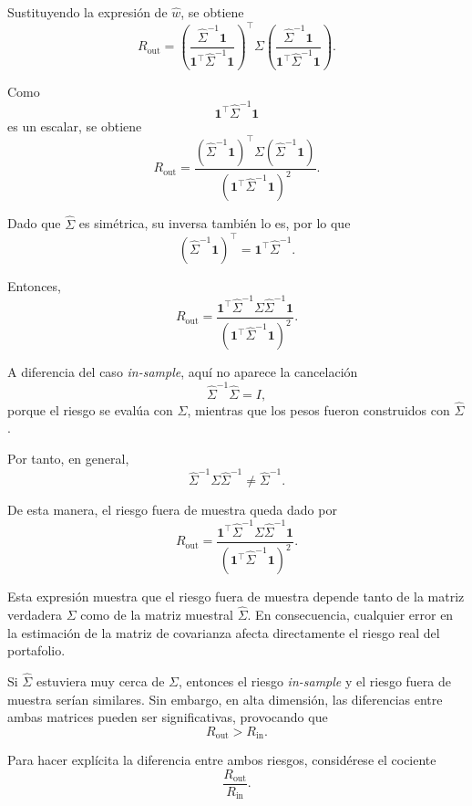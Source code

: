 \documentclass[letterpaper,12pt,oneside]{book}
\begin{document}
Sustituyendo la expresión de \(\widehat{w}\), se obtiene
\[
R_{\mathrm{out}}
=
\left(
\frac{
\widehat{\Sigma}^{-1}\mathbf{1}
}{
\mathbf{1}^\top
\widehat{\Sigma}^{-1}
\mathbf{1}
}
\right)^\top
\Sigma
\left(
\frac{
\widehat{\Sigma}^{-1}\mathbf{1}
}{
\mathbf{1}^\top
\widehat{\Sigma}^{-1}
\mathbf{1}
}
\right).
\]

Como
\[
\mathbf{1}^\top
\widehat{\Sigma}^{-1}
\mathbf{1}
\]
es un escalar, se obtiene
\[
R_{\mathrm{out}}
=
\frac{
(\widehat{\Sigma}^{-1}\mathbf{1})^\top
\Sigma
(\widehat{\Sigma}^{-1}\mathbf{1})
}{
\left(
\mathbf{1}^\top
\widehat{\Sigma}^{-1}
\mathbf{1}
\right)^2
}.
\]

Dado que \(\widehat{\Sigma}\) es simétrica, su inversa también lo es, por lo que
\[
(\widehat{\Sigma}^{-1}\mathbf{1})^\top
=
\mathbf{1}^\top
\widehat{\Sigma}^{-1}.
\]

Entonces,
\[
R_{\mathrm{out}}
=
\frac{
\mathbf{1}^\top
\widehat{\Sigma}^{-1}
\Sigma
\widehat{\Sigma}^{-1}
\mathbf{1}
}{
\left(
\mathbf{1}^\top
\widehat{\Sigma}^{-1}
\mathbf{1}
\right)^2
}.
\]

A diferencia del caso \textit{in-sample}, aquí no aparece la cancelación
\[
\widehat{\Sigma}^{-1}\widehat{\Sigma}=I,
\]
porque el riesgo se evalúa con \(\Sigma\), mientras que los pesos fueron construidos con \(\widehat{\Sigma}\).

Por tanto, en general,
\[
\widehat{\Sigma}^{-1}\Sigma\widehat{\Sigma}^{-1}
\neq
\widehat{\Sigma}^{-1}.
\]

De esta manera, el riesgo fuera de muestra queda dado por
\[
R_{\mathrm{out}}
=
\frac{
\mathbf{1}^\top
\widehat{\Sigma}^{-1}
\Sigma
\widehat{\Sigma}^{-1}
\mathbf{1}
}{
\left(
\mathbf{1}^\top
\widehat{\Sigma}^{-1}
\mathbf{1}
\right)^2
}.
\]

Esta expresión muestra que el riesgo fuera de muestra depende tanto de la matriz verdadera \(\Sigma\) como de la matriz muestral \(\widehat{\Sigma}\). En consecuencia, cualquier error en la estimación de la matriz de covarianza afecta directamente el riesgo real del portafolio.

Si \(\widehat{\Sigma}\) estuviera muy cerca de \(\Sigma\), entonces el riesgo \textit{in-sample} y el riesgo fuera de muestra serían similares. Sin embargo, en alta dimensión, las diferencias entre ambas matrices pueden ser significativas, provocando que
\[
R_{\mathrm{out}}
>
R_{\mathrm{in}}.
\]

Para hacer explícita la diferencia entre ambos riesgos, considérese el cociente
\[
\frac{R_{\mathrm{out}}}{R_{\mathrm{in}}}.
\]
\end{document}
